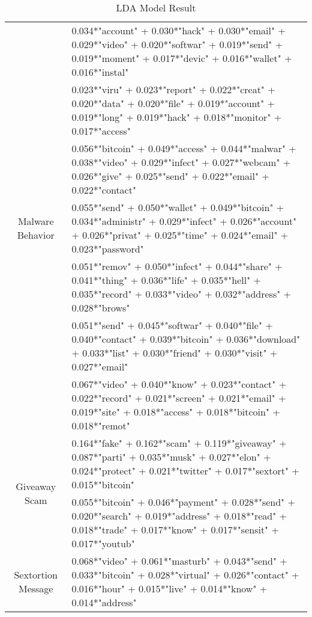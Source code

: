 \appendix

\begin{table*}[]
\caption{LDA Model Result}
\label{table:lda-result}
\begin{tabularx}{\textwidth}{|c|X|}
\hline
\multirow{7}{*}{Malware Behavior} & 0.034*"account" + 0.030*"hack" + 0.030*"email" + 0.029*"video" + 0.020*"softwar" + 0.019*"send" + 0.019*"moment" + 0.017*"devic" + 0.016*"wallet" + 0.016*"instal" \\ \cline{2-2} 
                      & 0.023*"viru" + 0.023*"report" + 0.022*"creat" + 0.020*"data" + 0.020*"file" + 0.019*"account" + 0.019*"long" + 0.019*"hack" + 0.018*"monitor" + 0.017*"access"   \\ \cline{2-2} 
                      &  0.056*"bitcoin" + 0.049*"access" + 0.044*"malwar" + 0.038*"video" + 0.029*"infect" + 0.027*"webcam" + 0.026*"give" + 0.025*"send" + 0.022*"email" + 0.022*"contact"  \\ \cline{2-2} 
                      & 0.055*"send" + 0.050*"wallet" + 0.049*"bitcoin" + 0.034*"administr" + 0.029*"infect" + 0.026*"account" + 0.026*"privat" + 0.025*"time" + 0.024*"email" + 0.023*"password"\\ \cline{2-2}   
                      & 0.051*"remov" + 0.050*"infect" + 0.044*"share" + 0.041*"thing" + 0.036*"life" + 0.035*"hell" + 0.035*"record" + 0.033*"video" + 0.032*"address" + 0.028*"brows"
\\ \cline{2-2} 
&0.051*"send" + 0.045*"softwar" + 0.040*"file" + 0.040*"contact" + 0.039*"bitcoin" + 0.036*"download" + 0.033*"list" + 0.030*"friend" + 0.030*"visit" + 0.027*"email" \\ \cline{2-2}
&0.067*"video" + 0.040*"know" + 0.023*"contact" + 0.022*"record" + 0.021*"screen" + 0.021*"email" + 0.019*"site" + 0.018*"access" + 0.018*"bitcoin" + 0.018*"remot"
\\ \hline


\multirow{2}{*}{Giveaway Scam} & 0.164*"fake" + 0.162*"scam" + 0.119*"giveaway" + 0.087*"parti" + 0.035*"musk" + 0.027*"elon" + 0.024*"protect" + 0.021*"twitter" + 0.017*"sextort" + 0.015*"bitcoin"\\ \cline{2-2}

& 0.055*"bitcoin" + 0.046*"payment" + 0.028*"send" + 0.020*"search" + 0.019*"address" + 0.018*"read" + 0.018*"trade" + 0.017*"know" + 0.017*"sensit" + 0.017*"youtub" 
\\ \hline
\multirow{6}{*}{Sextortion Message} & 0.068*"video" + 0.061*"masturb" + 0.043*"send" + 0.033*"bitcoin" + 0.028*"virtual" + 0.026*"contact" + 0.016*"hour" + 0.015*"live" + 0.014*"know" + 0.014*"address"\\ \cline{2-2}


\end{tabularx}
\end{table*}
